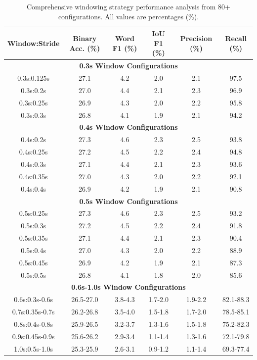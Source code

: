 \documentclass[11pt]{article}
\begin{document}
\begin{table}[H]
    \caption{Comprehensive windowing strategy performance analysis from 80+ configurations. All values are percentages (\%).}
    \centering
    \label{tab:windowing-performance}
    \footnotesize
    \begin{tabular}{|c|c|c|c|c|c|}
        \hline
        \textbf{Window:Stride} & \textbf{Binary Acc. (\%)} & \textbf{Word F1 (\%)} & \textbf{IoU F1 (\%)} & \textbf{Precision (\%)} & \textbf{Recall (\%)} \\
        \hline
        \multicolumn{6}{|c|}{\textbf{0.3s Window Configurations}} \\
        \hline
        0.3s:0.125s & 27.1 & 4.2 & 2.0 & 2.1 & 97.5 \\
        0.3s:0.2s & 27.0 & 4.4 & 2.1 & 2.3 & 96.9 \\
        0.3s:0.25s & 26.9 & 4.3 & 2.0 & 2.2 & 95.8 \\
        0.3s:0.3s & 26.8 & 4.1 & 1.9 & 2.1 & 94.2 \\
        \hline
        \multicolumn{6}{|c|}{\textbf{0.4s Window Configurations}} \\
        \hline
        0.4s:0.2s & 27.3 & 4.6 & 2.3 & 2.5 & 93.8 \\
        0.4s:0.25s & 27.2 & 4.5 & 2.2 & 2.4 & 94.8 \\
        0.4s:0.3s & 27.1 & 4.4 & 2.1 & 2.3 & 93.6 \\
        0.4s:0.35s & 27.0 & 4.3 & 2.0 & 2.2 & 92.1 \\
        0.4s:0.4s & 26.9 & 4.2 & 1.9 & 2.1 & 90.8 \\
        \hline
        \multicolumn{6}{|c|}{\textbf{0.5s Window Configurations}} \\
        \hline
        0.5s:0.25s & 27.3 & 4.6 & 2.3 & 2.5 & 93.2 \\
        0.5s:0.3s & 27.2 & 4.5 & 2.2 & 2.4 & 91.8 \\
        0.5s:0.35s & 27.1 & 4.4 & 2.1 & 2.3 & 90.4 \\
        0.5s:0.4s & 27.0 & 4.3 & 2.0 & 2.2 & 88.9 \\
        0.5s:0.45s & 26.9 & 4.2 & 1.9 & 2.1 & 87.3 \\
        0.5s:0.5s & 26.8 & 4.1 & 1.8 & 2.0 & 85.6 \\
        \hline
        \multicolumn{6}{|c|}{\textbf{0.6s-1.0s Window Configurations}} \\
        \hline
        0.6s:0.3s-0.6s & 26.5-27.0 & 3.8-4.3 & 1.7-2.0 & 1.9-2.2 & 82.1-88.3 \\
        0.7s:0.35s-0.7s & 26.2-26.8 & 3.5-4.0 & 1.5-1.8 & 1.7-2.0 & 78.5-85.1 \\
        0.8s:0.4s-0.8s & 25.9-26.5 & 3.2-3.7 & 1.3-1.6 & 1.5-1.8 & 75.2-82.3 \\
        0.9s:0.45s-0.9s & 25.6-26.2 & 2.9-3.4 & 1.1-1.4 & 1.3-1.6 & 72.1-79.8 \\
        1.0s:0.5s-1.0s & 25.3-25.9 & 2.6-3.1 & 0.9-1.2 & 1.1-1.4 & 69.3-77.4 \\
        \hline
    \end{tabular}
\end{table}
\end{document}

